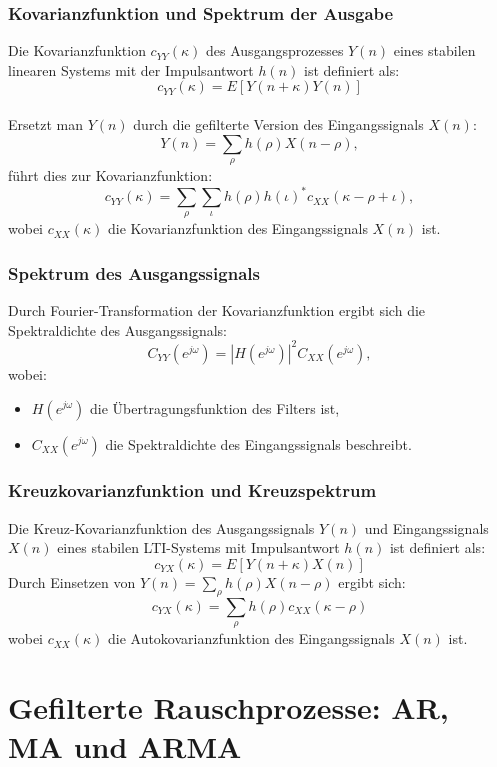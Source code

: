 \documentclass[12pt]{article}
\begin{document}
   \subsubsection{Kovarianzfunktion und Spektrum der Ausgabe}
      Die Kovarianzfunktion \(c_{YY}(\kappa)\) des Ausgangsprozesses \(Y(n)\) eines stabilen linearen Systems mit der Impulsantwort \(h(n)\) ist definiert als:
      \[
         c_{YY}(\kappa) = E[Y(n+\kappa)Y(n)]
      \] \\
      Ersetzt man \(Y(n)\) durch die gefilterte Version des Eingangssignals \(X(n)\):
      \[
         Y(n) = \sum_{\rho} h(\rho) X(n-\rho),
      \]
      führt dies zur Kovarianzfunktion:
      \[
         c_{YY}(\kappa) = \sum_{\rho}\sum_{\iota} h(\rho) h(\iota)^* c_{XX}(\kappa - \rho + \iota),   %
      \]
      wobei \(c_{XX}(\kappa)\) die Kovarianzfunktion des Eingangssignals \(X(n)\) ist.

   \subsubsection*{Spektrum des Ausgangssignals}
      Durch Fourier-Transformation der Kovarianzfunktion ergibt sich die Spektraldichte des Ausgangssignals:
      \[
         C_{YY}(e^{j\omega}) = |H(e^{j\omega})|^2 C_{XX}(e^{j\omega}),
      \]
      wobei:
      \begin{itemize}
         \item \(H(e^{j\omega})\) die Übertragungsfunktion des Filters ist,
         \item \(C_{XX}(e^{j\omega})\) die Spektraldichte des Eingangssignals beschreibt.
      \end{itemize}

   \subsubsection{Kreuzkovarianzfunktion und Kreuzspektrum}
      Die Kreuz-Kovarianzfunktion des Ausgangssignals \(Y(n)\) und Eingangssignals \(X(n)\) eines stabilen LTI-Systems mit Impulsantwort \(h(n)\) ist definiert als:
      \[
         c_{YX}(\kappa) = E[Y(n+\kappa)X(n)]
      \]
      Durch Einsetzen von \(Y(n) = \sum_{\rho} h(\rho) X(n-\rho)\) ergibt sich:
      \[
         c_{YX}(\kappa) = \sum_\rho h(\rho) c_{XX}(\kappa-\rho)
      \]
      wobei \(c_{XX}(\kappa)\) die Autokovarianzfunktion des Eingangssignals \(X(n)\) ist.

\newpage

\section{Gefilterte Rauschprozesse: AR, MA und ARMA}
\end{document}
